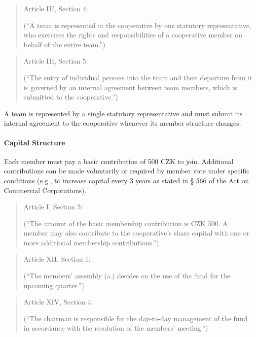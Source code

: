 \begin{quote}
    Article III, Section 4: 

    (\enquote{A team is represented in the cooperative by one statutory representative, who exercises the rights and responsibilities of a cooperative member on behalf of the entire team.})
\end{quote}
\begin{quote}
    Article III, Section 5: 

    (\enquote{The entry of individual persons into the team and their departure from it is governed by an internal agreement between team members, which is submitted to the cooperative.})
\end{quote}

A team is represented by a single statutory representative and must submit its internal agreement to the cooperative whenever its member structure changes.

\paragraph{Capital Structure}
Each member must pay a basic contribution of 500 CZK to join. Additional contributions can be made voluntarily or required by member vote under specific conditions (e.g., to increase capital every 3 years as stated in § 566 of the Act on Commercial Corporations).
\begin{quote}
    Article I, Section 5: 

    (\enquote{The amount of the basic membership contribution is CZK 500. A member may also contribute to the cooperative's share capital with one or more additional membership contributions.})
\end{quote}
\begin{quote}
    Article XII, Section 1: 

    (\enquote{The members’ assembly (a.) decides on the use of the fund for the upcoming quarter.})
\end{quote}
\begin{quote}
    Article XIV, Section 4: 

    (\enquote{The chairman is responsible for the day-to-day management of the fund in accordance with the resolution of the members’ meeting.})
\end{quote}

